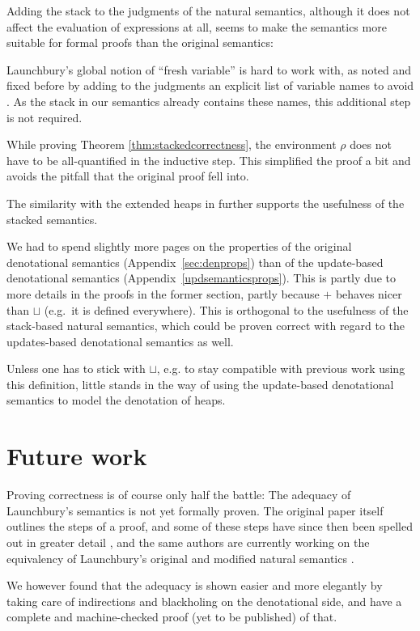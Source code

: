 \documentclass[twopage]{scrartcl}
\theoremstyle{nonumberbreak}
\begin{document}
Adding the stack to the judgments of the natural semantics, although it does not affect the evaluation of expressions at all, seems to make the semantics more suitable for formal proofs than the original semantics:
\begin{compactitem}
\item Launchbury’s global notion of “fresh variable” is hard to work with, as noted and fixed before by adding to the judgments an explicit list of variable names to avoid \cite{sestoft}. As the stack in our semantics already contains these names, this additional step is not required.
\item While proving Theorem \ref{thm:stackedcorrectness}, the environment $\rho$ does not have to be all-quantified in the inductive step. This simplified the proof a bit and avoids the pitfall that the original proof fell into.
\end{compactitem}
The similarity with the extended heaps in \cite{distributed} further supports the usefulness of the stacked semantics.

We had to spend slightly more pages on the properties of the original denotational semantics (Appendix~\ref{sec:denprops}) than of the update-based denotational semantics (Appendix~\ref{updsemanticsprops}). This is partly due to more details in the proofs in the former section, partly because $+$ behaves nicer than $\sqcup$ (e.g.\ it is defined everywhere). This is orthogonal to the usefulness of the stack-based natural semantics, which could be proven correct with regard to the updates-based denotational semantics as well.

Unless one has to stick with $\sqcup$, e.g. to stay compatible with previous work using this definition, little stands in the way of using the update-based denotational semantics to model the denotation of heaps.

\section{Future work}

Proving correctness is of course only half the battle: The adequacy of Launchbury’s semantics is not yet formally proven. The original paper itself outlines the steps of a proof, and some of these steps have since then been spelled out in greater detail \cite{functionspaces}, and the same authors are currently working on the equivalency of Launchbury’s original and modified natural semantics \cite{indirections}.

We however found that the adequacy is shown easier and more elegantly by taking
care of indirections and blackholing on the denotational side, and have a
complete and machine-checked proof (yet to be published) of that.
\end{document}

